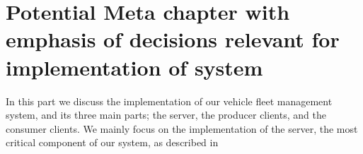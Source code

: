 \chapter{Potential Meta chapter with emphasis of decisions relevant for implementation of system}
In this part we discuss the implementation of our vehicle fleet management system, and its three main parts; the server, the producer clients, and the consumer clients.
We mainly focus on the implementation of the server, the most critical component of our system, as described in 
